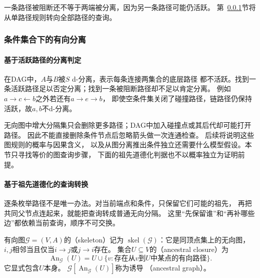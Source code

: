 一条路径被阻断还不等于两端被分离，因为另一条路径可能仍活跃。
第~\ref{sec:graph-theory-conditional-separation}节将从单路径规则转向全部路径的查询。

\subsubsection{条件集合下的有向分离}
\label{sec:graph-theory-conditional-separation}

\paragraph{基于活跃路径的分离判定}

在DAG中，\(A\)与\(B\)被\(S\) d-分离，表示每条连接两集合的底层路径
都不活跃。找到一条活跃路径足以否定分离；找到一条被阻断路径却不足以肯定分离。
例如\(a\to c\leftarrow b\)之外若还有\(a\to e\to b\)，
即使空条件集关闭了碰撞路径，链路径仍保持活跃，故\(a,b\)不d-分离。

无向图中增大分隔集只会删除更多路径；DAG中加入碰撞点或其后代却可能打开路径。
因此不能直接删除条件节点后忽略箭头做一次连通检查。
后续将说明这些图规则的概率与因果含义，
以及从图分离推出条件独立还需要什么模型假设。本节只寻找等价的图查询步骤，
下面的祖先道德化判据也不以概率独立为证明前提。

\paragraph{基于祖先道德化的查询转换}
\label{sec:graph-theory-directed-transformations}

逐条枚举路径不是唯一办法。对当前端点和条件，只保留它们可能的祖先，
再把共同父节点连起来，就能把查询转成普通无向分隔。
这里“先保留谁”和“再补哪些边”都依赖当前查询，顺序不可交换。

\begin{definition}[骨架、祖先闭包与诱导祖先图]
  \label{def:graph-theory-directed-structure}
  有向图\(\mathcal G=(V,A)\)的（skeleton）记为
  \(\operatorname{skel}(\mathcal G)\)：它是同顶点集上的无向图，
  \(i,j\)相邻当且仅当\(i\to j\)或\(j\to i\)存在。
  集合\(U\subseteq V\)的（ancestral closure）为
  \[
    \operatorname{An}_{\mathcal G}(U)
    =U\cup\{v:\text{存在从\(v\)到\(U\)中某点的有向路径}\}.
  \]
  它显式包含\(U\)本身。
  \(\mathcal G[\operatorname{An}_{\mathcal G}(U)]\)称为诱导
  （ancestral graph）。
\end{definition}

